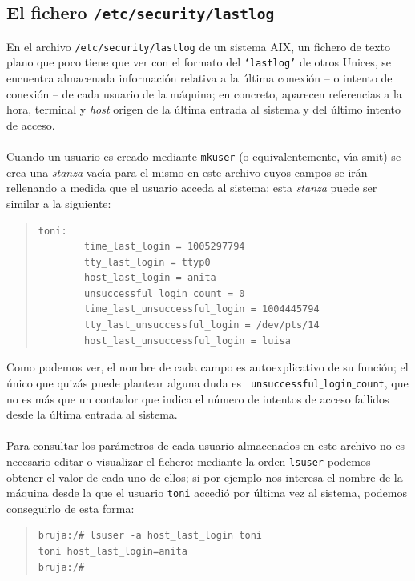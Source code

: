 \subsection{El fichero {\tt /etc/security/lastlog}}
En el archivo {\tt /etc/security/lastlog} de un sistema AIX, un fichero de
texto plano que poco tiene que ver con el formato del {\tt `lastlog'} de otros 
Unices, se encuentra almacenada informaci\'on relativa a la \'ultima 
conexi\'on -- o intento de conexi\'on -- de cada usuario de la m\'aquina; en
concreto, aparecen referencias a la hora, terminal y {\it host} origen de la
\'ultima entrada al sistema y del \'ultimo intento de acceso.\\
\\Cuando un usuario es creado mediante {\tt mkuser} (o equivalentemente, 
v\'{\i}a {\sc smit}) se crea una {\it stanza} vac\'{\i}a para el mismo en este 
archivo cuyos campos se ir\'an rellenando a medida que el usuario acceda al
sistema; esta {\it stanza} puede ser similar a la siguiente:
\begin{quote}
\begin{verbatim}
toni:
        time_last_login = 1005297794
        tty_last_login = ttyp0           
        host_last_login = anita
        unsuccessful_login_count = 0         
        time_last_unsuccessful_login = 1004445794
        tty_last_unsuccessful_login = /dev/pts/14     
        host_last_unsuccessful_login = luisa
\end{verbatim}
\end{quote}
Como podemos ver, el nombre de cada campo es autoexplicativo de su funci\'on; el
\'unico que quiz\'as puede plantear alguna duda es {\tt 
unsuccessful$\_$login$\_$count}, que no es m\'as que un contador que indica el
n\'umero de intentos de acceso fallidos desde la \'ultima entrada al sistema.\\
\\Para consultar los par\'ametros de cada usuario almacenados en este archivo
no es necesario editar o visualizar el fichero: mediante la orden {\tt lsuser}
podemos obtener el valor de cada uno de ellos; si por ejemplo nos interesa
el nombre de la m\'aquina desde la que el usuario {\tt toni} accedi\'o por
\'ultima vez al sistema, podemos conseguirlo de esta forma:
\begin{quote}
\begin{verbatim}
bruja:/# lsuser -a host_last_login toni
toni host_last_login=anita
bruja:/# 
\end{verbatim}
\end{quote}

